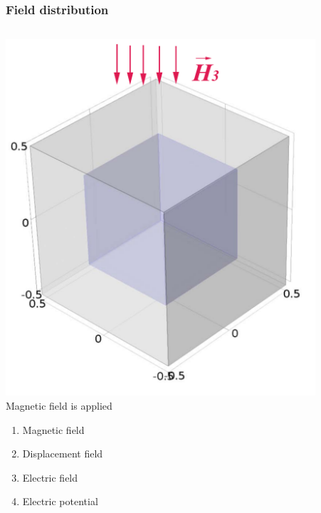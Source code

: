 \documentclass[compress]{beamer}
\begin{document}
\begin{frame}\frametitle{Field distribution}
\begin{columns}[totalwidth=\textwidth]
   \begin{column}{.38\textwidth}
   \includegraphics[width=0.9\textwidth]{Graphic/04_geocube.pdf}
   Magnetic field is applied
   \begin{enumerate}[label=(\alph*), font=\small, leftmargin=*]
	\item Magnetic field 
	\item Displacement field 
	\item Electric field 
	\item Electric potential 
	\end{enumerate}
   \end{column}
   \begin{column}{.62\textwidth}

\end{column}
\end{columns}
\end{frame}
\end{document}
